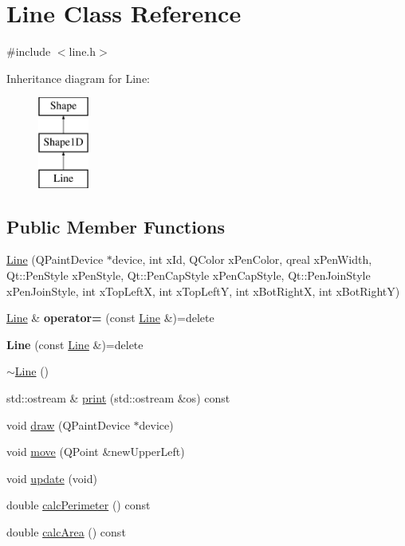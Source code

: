 \hypertarget{classLine}{\section{Line Class Reference}
\label{classLine}
}


{\ttfamily \#include $<$line.\-h$>$}

Inheritance diagram for Line\-:\begin{figure}[H]
\begin{center}
\leavevmode
\includegraphics[height=3.000000cm]{classLine}
\end{center}
\end{figure}
\subsection*{Public Member Functions}
\begin{DoxyCompactItemize}
\item 
\hyperlink{classLine_a93d8a59e89500066516ca68a77a33d48}{Line} (Q\-Paint\-Device $\ast$device, int x\-Id, Q\-Color x\-Pen\-Color, qreal x\-Pen\-Width, Qt\-::\-Pen\-Style x\-Pen\-Style, Qt\-::\-Pen\-Cap\-Style x\-Pen\-Cap\-Style, Qt\-::\-Pen\-Join\-Style x\-Pen\-Join\-Style, int x\-Top\-Left\-X, int x\-Top\-Left\-Y, int x\-Bot\-Right\-X, int x\-Bot\-Right\-Y)
\item 
\hypertarget{classLine_a870c3c74ac53e7ce16586345b2181ad7}{\hyperlink{classLine}{Line} \& {\bfseries operator=} (const \hyperlink{classLine}{Line} \&)=delete}\label{classLine_a870c3c74ac53e7ce16586345b2181ad7}

\item 
\hypertarget{classLine_a39f1d91cfb4c01a8580d149af73c89b2}{{\bfseries Line} (const \hyperlink{classLine}{Line} \&)=delete}\label{classLine_a39f1d91cfb4c01a8580d149af73c89b2}

\item 
\hyperlink{classLine_aabe85f48d22d92b62257091f48174fac}{$\sim$\-Line} ()
\item 
std\-::ostream \& \hyperlink{classLine_a9535dc5fe2c3e66e548add6622e4b0ea}{print} (std\-::ostream \&os) const 
\item 
void \hyperlink{classLine_a5bb42c21fb963bbdca7c928f055376d5}{draw} (Q\-Paint\-Device $\ast$device)
\item 
void \hyperlink{classLine_acb2ae2fa8e058adbeea14c3966199090}{move} (Q\-Point \&new\-Upper\-Left)
\item 
void \hyperlink{classLine_a2338aa100616356ad580303478c102c2}{update} (void)
\item 
double \hyperlink{classLine_a804e2a31c02b0b5cfefe2e063e7fc52f}{calc\-Perimeter} () const 
\item 
double \hyperlink{classLine_ad4ab9f8147bd69fe385fcf5c14c5f46e}{calc\-Area} () const 
\end{DoxyCompactItemize}
